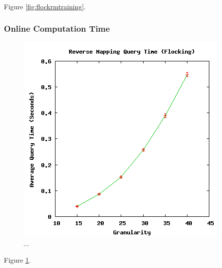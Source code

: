 Figure \ref{fig:flockrmtraining}.

  \subsubsection{Online Computation Time}

\begin{figure}[ht]
\centering
\includegraphics[scale=.5]{images/results_flocking/rmquery.png}
\caption{...}
\label{fig:flockrmquery}
\end{figure}

Figure \ref{fig:flockrmquery}.




